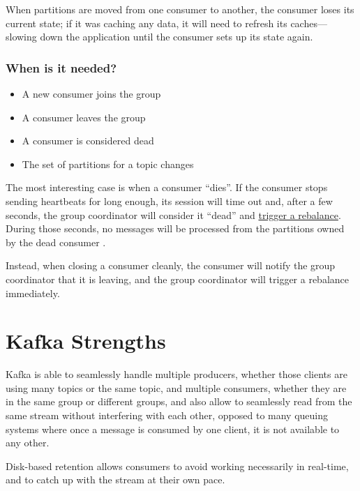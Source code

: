 When partitions are moved from one consumer to another, the consumer loses its current state; if it was caching any data, it will need to refresh its caches—slowing down the application until the consumer sets up its state again.

\subsubsection{When is it needed?}
\begin{itemize}
   \item A new consumer joins the group
   \item A consumer leaves the group
   \item A consumer is considered dead
   \item The set of partitions for a topic changes
\end{itemize}

The most interesting case is when a consumer ``dies''.
If the consumer stops sending heartbeats for long enough, its session will time
out and, after a few seconds, the group coordinator will consider it ``dead'' and \ul{trigger a rebalance}.
During those seconds, no messages will be processed from the partitions owned by the dead consumer \frownie.

Instead, when closing a consumer cleanly, the consumer will notify the group coordinator that it is leaving, and the group coordinator will trigger a rebalance immediately.

\section{Kafka Strengths}
Kafka is able to seamlessly handle multiple producers, whether those clients
are using many topics or the same topic, and multiple consumers, whether they are in the same group or different groups, and also allow to seamlessly read from the same stream without interfering with each other, opposed to many queuing systems where once a message is consumed by one client, it is not available to any other.

Disk-based retention allows consumers to avoid working necessarily in real-time, and to catch up with the stream at their own pace.
